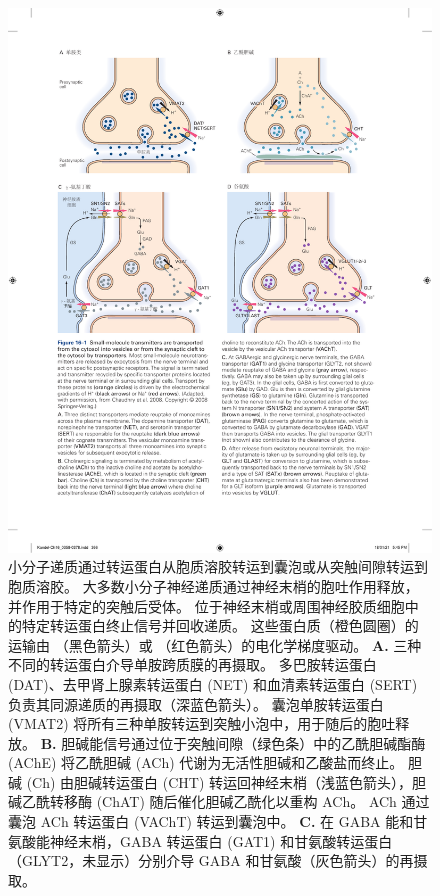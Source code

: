 \begin{figure}[htbp]
	\centering
	\includegraphics[width=0.95\linewidth]{chap16/fig_16_1}
	\caption{小分子递质通过转运蛋白从胞质溶胶转运到囊泡或从突触间隙转运到胞质溶胶。
		大多数小分子神经递质通过神经末梢的胞吐作用释放，并作用于特定的突触后受体。
		位于神经末梢或周围神经胶质细胞中的特定转运蛋白终止信号并回收递质。
		这些蛋白质（橙色圆圈）的运输由 （黑色箭头）或 （红色箭头）的电化学梯度驱动\cite{chaudhry2008pharmacology}。 
		\textbf{A.} 三种不同的转运蛋白介导单胺跨质膜的再摄取。
		多巴胺转运蛋白 (DAT)、去甲肾上腺素转运蛋白 (NET) 和血清素转运蛋白 (SERT) 负责其同源递质的再摄取（深蓝色箭头）。
		囊泡单胺转运蛋白 (VMAT2) 将所有三种单胺转运到突触小泡中，用于随后的胞吐释放。
		\textbf{B.} 胆碱能信号通过位于突触间隙（绿色条）中的乙酰胆碱酯酶 (AChE) 将乙酰胆碱 (ACh) 代谢为无活性胆碱和乙酸盐而终止。
		胆碱 (Ch) 由胆碱转运蛋白 (CHT) 转运回神经末梢（浅蓝色箭头），胆碱乙酰转移酶 (ChAT) 随后催化胆碱乙酰化以重构 ACh。 ACh 通过囊泡 ACh 转运蛋白 (VAChT) 转运到囊泡中。
		\textbf{C.} 在 GABA 能和甘氨酸能神经末梢，GABA 转运蛋白 (GAT1) 和甘氨酸转运蛋白（GLYT2，未显示）分别介导 GABA 和甘氨酸（灰色箭头）的再摄取。
}
\end{figure}
